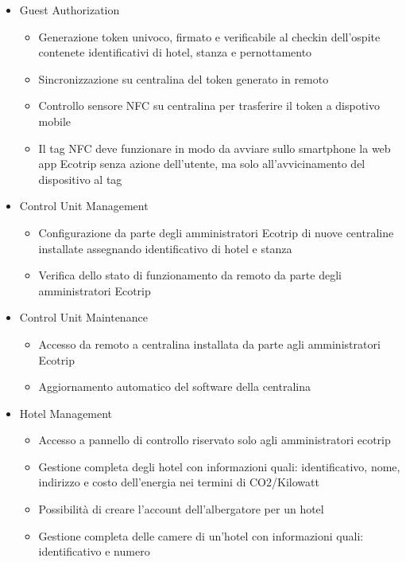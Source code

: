 \begin{itemize}
    \begin{itemize}
        \item Guest Authorization
        \begin{itemize}
            \item Generazione token univoco, firmato e verificabile al checkin dell'ospite contenete identificativi di hotel, stanza e pernottamento
            \item Sincronizzazione su centralina del token generato in remoto
            \item Controllo sensore NFC su centralina per trasferire il token a dispotivo mobile
            \item Il tag NFC deve funzionare in modo da avviare sullo smartphone la web app Ecotrip senza azione dell'utente, 
                    ma solo all'avvicinamento del dispositivo al tag
        \end{itemize}
    \end{itemize}

    \begin{itemize}
        \item Control Unit Management
        \begin{itemize}
            \item Configurazione da parte degli amministratori Ecotrip di nuove centraline installate assegnando identificativo di hotel e stanza
            \item Verifica dello stato di funzionamento da remoto da parte degli amministratori Ecotrip
        \end{itemize}
    \end{itemize}

    \begin{itemize}
        \item Control Unit Maintenance
        \begin{itemize}
            \item Accesso da remoto a centralina installata da parte agli amministratori Ecotrip
            \item Aggiornamento automatico del software della centralina
        \end{itemize}
    \end{itemize}

    \begin{itemize}
        \item Hotel Management
        \begin{itemize}
            \item Accesso a pannello di controllo riservato solo agli amministratori ecotrip
            \item Gestione completa degli hotel con informazioni quali: identificativo, nome, indirizzo e costo dell'energia nei termini di CO2/Kilowatt
            \item Possibilità di creare l'account dell'albergatore per un hotel
            \item Gestione completa delle camere di un'hotel con informazioni quali: identificativo e numero
        \end{itemize}
    \end{itemize}


\end{itemize}
